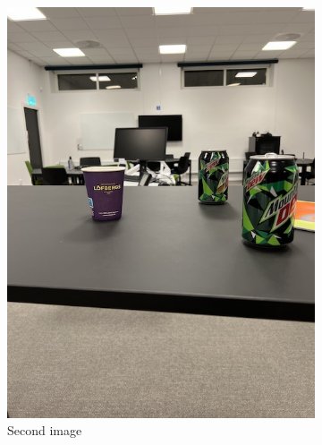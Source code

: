 \documentclass{article}
\begin{document}
\begin{figure}[H]
\begin{subfigure}{0.32\textwidth}
            \includegraphics[width=1\textwidth]{im2.jpg}
            \caption{Second image}
            \label{fig:sub:flow-second-frame}
        \end{subfigure}  
        \begin{subfigure}{0.32\textwidth}
            \centering

\end{subfigure}
\end{figure}
\end{document}
